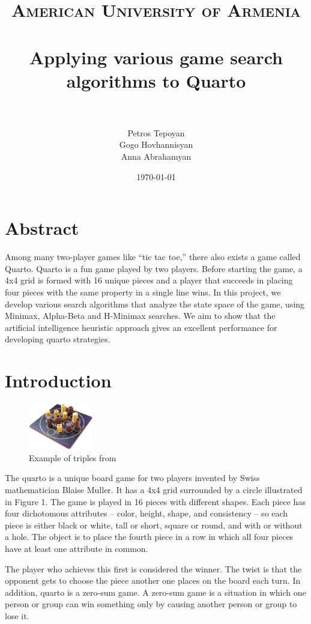 \documentclass[paper=a4, fontsize=11pt]{article} %
\title{	
\normalfont \normalsize 
\textsc{American University of Armenia} \\ [25pt] %
\horrule{0.5pt} \\[0.4cm] %
\huge Applying various game search algorithms to Quarto\\ %
\horrule{2pt} \\[0.5cm] %
}
\author{
	Petros Tepoyan \\
	Gogo Hovhannisyan \\
	Anna Abrahamyan } %
\date{\normalsize\today} %
\begin{document}
\maketitle %

\section*{Abstract}

Among many two-player games like “tic tac toe,” there also exists a game called Quarto. Quarto is a fun game played by two players. Before starting the game, a 4x4 grid is formed with 16 unique pieces and a player that succeeds in placing four pieces with the same property in a single line wins. In this project, we develop various search algorithms that analyze the state space of the game, using Minimax, Alpha-Beta and H-Minimax searches. We aim to show that the artificial intelligence heuristic approach gives an excellent performance for developing quarto strategies.


\tableofcontents

\newpage

\section{Introduction}


\begin{figure}
	\centering
	\includegraphics[width=0.25\textwidth]{quarto_game}
	\caption{Example of triples from \cite{cpluscode}}
\end{figure}

The quarto is a unique board game for two players invented by Swiss mathematician Blaise Muller. It has a 4x4 grid surrounded by a circle illustrated in Figure 1. The game is played in 16 pieces with different shapes. Each piece has four dichotomous attributes – color, height, shape, and consistency – so each piece is either black or white, tall or short, square or round, and with or without a hole. The object is to place the fourth piece in a row in which all four pieces have at least one attribute in common. 

The player who achieves this first is considered the winner. The twist is that the opponent gets to choose the piece another one places on the board each turn. In addition, quarto is a zero-sum game. A zero-sum game is a situation in which one person or group can win something only by causing another person or group to lose it.
\end{document}
